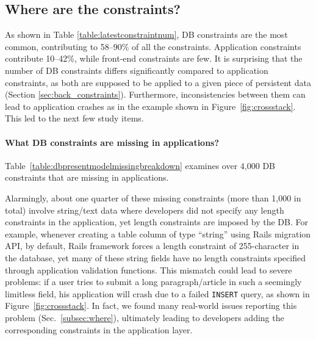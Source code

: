 \subsection{Where are the constraints?}
\label{sec:one_where}

As shown in Table \ref{table:latestconstraintnum}, DB constraints are the most common, contributing to
58--90\% of all the constraints. Application constraints contribute 10--42\%, while front-end constraints are few.   
It is surprising that the number of DB constraints differs significantly compared to
application constraints, as both are supposed to be applied to a given piece of persistent data (Section \ref{sec:back_constraints}). Furthermore, inconsistencies
between them can lead to application crashes as in the example shown in Figure~\ref{fig:crossstack}. 
This led to the next few study items.

\paragraph{\bf What DB constraints are missing in applications?}
Table~\ref{table:dbpresentmodelmissingbreakdown} examines over
4,000 DB constraints that are missing in applications.

Alarmingly, about one quarter of these missing constraints (more than 1,000 in total)  involve string/text
data where developers did not specify any length constraints in the application, 
yet length constraints are imposed by the DB.
For example, 
whenever creating a table column of type ``string'' using Rails migration API, by default, Rails framework forces a length constraint of 255-character in the database, yet many of these string fields have no length constraints specified through application validation functions.
This mismatch could lead to severe problems: if a user tries to submit a long
paragraph/article in such a seemingly limitless field, his application will crash due to a failed {\tt INSERT} query, as shown in Figure~\ref{fig:crossstack}. In fact, we found many real-world issues reporting this problem (Sec.~\ref{subsec:where}), ultimately leading to developers adding the corresponding constraints in the application layer.

